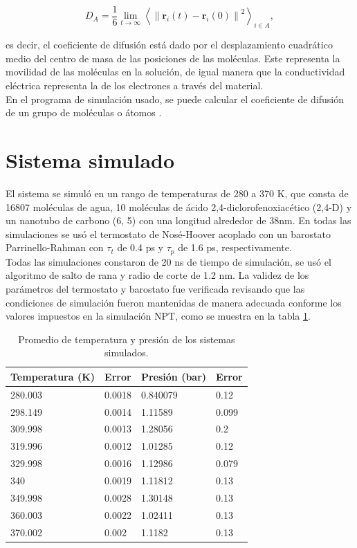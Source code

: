 \begin{equation} \label{diffusioncoeff}
    D_A = \frac{1}{6} \lim_{t \to \infty} \left\langle\left\| \mathbf{r}_{i}(t) - \mathbf{r}_{i}(0) \right\|^2 \right\rangle_{i \in A},
\end{equation}

\noindent es decir, el coeficiente de difusión está dado por el desplazamiento cuadrático medio del centro de masa de las posiciones de las moléculas. Este representa la movilidad de las moléculas en la solución, de igual manera que la conductividad eléctrica representa la de los electrones a través del material.\\

En el programa de simulación usado, se puede calcular el coeficiente de difusión de un grupo de moléculas o átomos \cite{gromacsdoc}.

\section{Sistema simulado}

El sistema se simuló en un rango de temperaturas de 280 a 370 K, que consta de 16807 moléculas de agua, 10 moléculas de ácido 2,4-diclorofenoxiacético (2,4-D) y un nanotubo de carbono (6, 5) con una longitud alrededor de 38nm. En todas las simulaciones se usó el termostato de Nosé-Hoover acoplado con un barostato Parrinello-Rahman con $\tau_t$ de 0.4 ps y $\tau_p$ de 1.6 ps, respectivamente.\\

Todas las simulaciones constaron de 20 ns de tiempo de simulación, se usó el algoritmo de salto de rana y radio de corte de 1.2 nm. La validez de los parámetros del termostato y barostato fue verificada revisando que las condiciones de simulación fueron mantenidas de manera adecuada conforme los valores impuestos en la simulación NPT, como se muestra en la tabla \ref{tab:promediostemppres}.

\begin{table}[h!]
    \centering
    \begin{tabular}{ |m{6em}|m{5em}||m{5em}|m{5em}|  }
    \hline
    Temperatura (K) & Error & Presión (bar) & Error \\
    \hline
    \hline
    280.003 & 0.0018 & 0.840079 & 0.12 \\
    298.149 & 0.0014 & 1.11589 & 0.099 \\
    309.998 & 0.0013 & 1.28056 & 0.2 \\
    319.996 & 0.0012 & 1.01285 & 0.12 \\
    329.998 & 0.0016 & 1.12986 & 0.079 \\
    340 & 0.0019 & 1.11812 & 0.13 \\
    349.998 & 0.0028 & 1.30148 & 0.13 \\
    360.003 & 0.0022 & 1.02411 & 0.13 \\
    370.002 & 0.002 & 1.1182 & 0.13 \\
    \hline
    \end{tabular}
    \caption{Promedio de temperatura y presión de los sistemas simulados.}
    \label{tab:promediostemppres}
\end{table}

